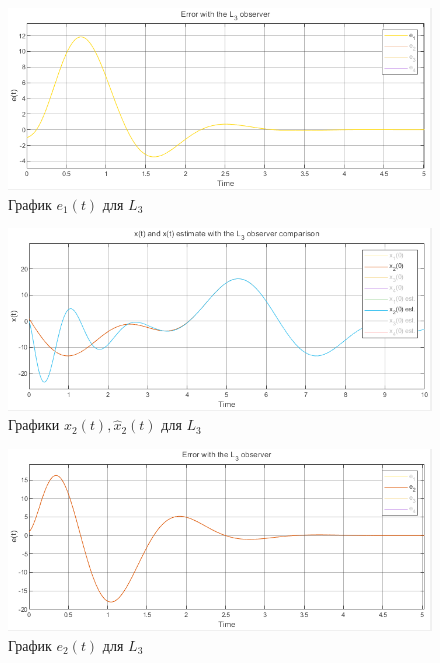\documentclass[a4paper, 12pt]{article}
\begin{document}
    \newpage
    \vspace*{5mm}
    \begin{figure}[H]
        \centering
        \includegraphics[scale=0.7]{2task_e1_L3.png}
        \captionsetup{skip=0pt}
        \caption{График $e_1(t)$ для $L_3$}
        \label{fig:2task_e1_L3}
    \end{figure}
    \begin{figure}[H]
        \centering
        \includegraphics[scale=0.7]{2task_x2comp_L3.png}
        \captionsetup{skip=0pt}
        \caption{Графики $x_2(t),\hat{x}_2(t)$ для $L_3$}
        \label{fig:2task_x2comp_L3}
    \end{figure}
    \begin{figure}[H]
        \centering
        \includegraphics[scale=0.7]{2task_e2_L3.png}
        \captionsetup{skip=0pt}
        \caption{График $e_2(t)$ для $L_3$}
        \label{fig:2task_e2_L3}
    \end{figure}
\end{document}
